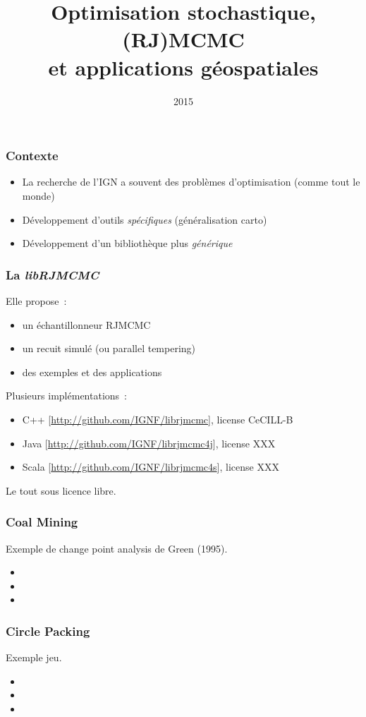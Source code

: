 \documentclass{beamer}
\title{Optimisation stochastique, (RJ)MCMC\\ et applications g\'eospatiales}
\author{}
\institute{IGN}
\date{2015}
\begin{document}
\frame{\titlepage}
 
\begin{frame}
\frametitle{Contexte}
\begin{itemize}
\item La recherche de l'IGN a souvent des probl\`emes d'optimisation (comme tout le monde)
\item D\'eveloppement d'outils \emph{sp\'ecifiques} (g\'en\'eralisation carto)
\item D\'eveloppement d'un biblioth\`eque plus \emph{g\'en\'erique}
\end{itemize}
\end{frame}

\begin{frame}
\frametitle{La \emph{libRJMCMC}}
Elle propose~:
\begin{itemize}
\item un \'echantillonneur RJMCMC
\item un recuit simul\'e (ou parallel tempering)
\item des exemples et des applications
\end{itemize}
Plusieurs impl\'ementations~:
\begin{itemize}
\item C++ \small[\url{http://github.com/IGNF/librjmcmc}], license CeCILL-B
\item Java \small[\url{http://github.com/IGNF/librjmcmc4j}], license XXX
\item Scala \small[\url{http://github.com/IGNF/librjmcmc4s}], license XXX
\end{itemize}
Le tout sous licence libre.
\end{frame}

\begin{frame}
\frametitle{Coal Mining}
Exemple de change point analysis de Green (1995).
\begin{itemize}
\item 
\item 
\item 
\end{itemize}
\end{frame}

\begin{frame}
\frametitle{Circle Packing}
Exemple jeu.
\begin{itemize}
\item 
\item 
\item 
\end{itemize}
\end{frame}
\end{document}
